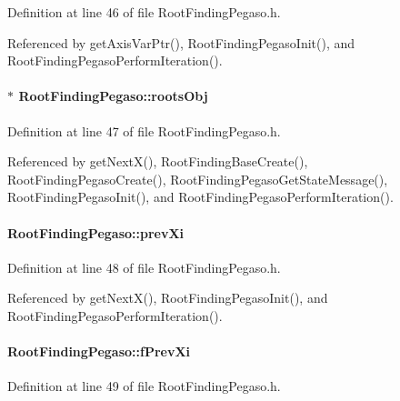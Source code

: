 Definition at line 46 of file RootFindingPegaso.h.

Referenced by getAxisVarPtr(), RootFindingPegasoInit(), and RootFindingPegasoPerformIteration().\hypertarget{structRootFindingPegaso_ec361d173e8df28abcec266eae70034d}{
\paragraph[rootsObj]{$\ast$ {\bf RootFindingPegaso::rootsObj}}\hfill}
\label{structRootFindingPegaso_ec361d173e8df28abcec266eae70034d}




Definition at line 47 of file RootFindingPegaso.h.

Referenced by getNextX(), RootFindingBaseCreate(), RootFindingPegasoCreate(), RootFindingPegasoGetStateMessage(), RootFindingPegasoInit(), and RootFindingPegasoPerformIteration().\hypertarget{structRootFindingPegaso_2f24143722208254c69d9c7ec625d1b7}{
\paragraph[prevXi]{ {\bf RootFindingPegaso::prevXi}}\hfill}
\label{structRootFindingPegaso_2f24143722208254c69d9c7ec625d1b7}




Definition at line 48 of file RootFindingPegaso.h.

Referenced by getNextX(), RootFindingPegasoInit(), and RootFindingPegasoPerformIteration().\hypertarget{structRootFindingPegaso_92c1b802760bd0cf4be51faddc74d662}{
\paragraph[fPrevXi]{ {\bf RootFindingPegaso::fPrevXi}}\hfill}
\label{structRootFindingPegaso_92c1b802760bd0cf4be51faddc74d662}




Definition at line 49 of file RootFindingPegaso.h.

